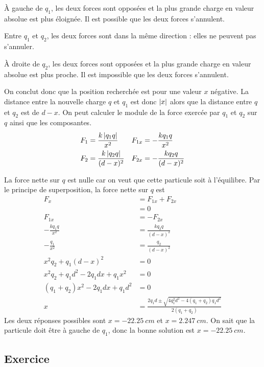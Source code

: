 À gauche de $q_1$, les deux forces sont opposées et la plus grande charge en
valeur absolue est plus éloignée. Il est possible que les deux forces
s'annulent.

Entre $q_1$ et $q_2$, les deux forces sont dans la même direction : elles ne
peuvent pas s'annuler.

À droite de $q_2$, les deux forces sont opposées et la plus grande charge en
valeur absolue est plus proche. Il est impossible que les deux forces
s'annulent.

On conclut donc que la position recherchée est pour une valeur $x$ négative. La
distance entre la nouvelle charge $q$ et $q_1$ est donc $\left| x \right|$ alors que la
distance entre $q$ et $q_2$ est de $d - x$. On peut calculer le module de la
force exercée par $q_1$ et $q_2$ sur $q$ ainsi que les composantes.
\begin{align*}
  F_1 &= \frac{k\left| q_1q \right|}{x^2}        &  F_{1x} &= -\frac{kq_1q}{x^2} \\
  F_2 &= \frac{k\left| q_2q \right|}{(d - x)^2}  &  F_{2x} &= -\frac{kq_2q}{(d - x)^2}
\end{align*}

La force nette sur $q$ est nulle car on veut que cette particule soit à
l'équilibre.  Par le principe de superposition, la force nette sur $q$ est
\begin{align*}
     F_x &= F_{1x} + F_{2x} \\
         &= 0  \\
  F_{1x} &= -F_{2x} \\
  -\frac{kq_1q}{x^2} &= \frac{kq_2q}{(d - x)^2} \\
  -\frac{q_1}{x^2} &= \frac{q_2}{(d - x)^2} \\
  x^2q_2 + q_1(d - x)^2 &= 0 \\
  x^2q_2 + q_1d^2 - 2q_1dx + q_1x^2 &= 0 \\
  (q_1 + q_2) x^2 - 2 q_1 d x + q_1d^2 &= 0 \\
  x &= \frac{2q_1 d \pm \sqrt{4q_1^2d^2 - 4(q_1 + q_2) q_1 d^2}}{2(q_1 + q_2)}
\end{align*}
Les deux réponses possibles sont $x = \SI{-22.25}{cm}$ et $x = \SI{2.247}{cm}$.
On sait que la particule doit être à gauche de $q_1$, donc la bonne solution
est $x = \SI{-22.25}{cm}$.



\subsection*{Exercice}

